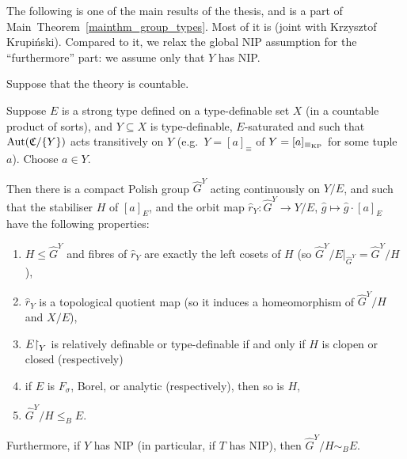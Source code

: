 	
	The following is one of the main results of the thesis, and is a part of Main~Theorem~\ref{mainthm_group_types}. Most of it is \cite[Theorem 8.1]{KR18} (joint with Krzysztof Krupiński). Compared to it, we relax the global NIP assumption for the ``furthermore'' part: we assume only that $Y$ has NIP.
	\begin{thm}
		\label{thm:main_aut}
		Suppose that the theory is countable.
		
		Suppose $E$ is a strong type defined on a type-definable set $X$ (in a countable product of sorts), and $Y\subseteq X$ is type-definable, $E$-saturated and such that $\operatorname{{Aut}}({\mathfrak C}/\{Y\})$ acts transitively on $Y$ (e.g.\ $Y=[a]_{\equiv}$ of $Y=[a]_{\equiv_{\mathrm{KP}}}$ for some tuple $a$). Choose $a\in Y$.
		
		Then there is a compact Polish group $\hat G^Y$ acting continuously on $Y/E$, and such that the stabiliser $H$ of $[a]_E$, and the orbit map $\hat r_Y\colon \hat G^Y\to Y/E$, $\hat g\mapsto \hat g\cdot [a]_E$ have the following properties:
		\begin{enumerate}
			\item
			$H\leq \hat G^Y$ and fibres of $\hat r_Y$ are exactly the left cosets of $H$ (so $\hat G^Y/E|_{\hat G^Y}=\hat G^Y/H$),
			\item
			$\hat r_Y$ is a topological quotient map (so it induces a homeomorphism of $\hat G^Y/H$ and $X/E$),
			\item
			$E\mathord{\upharpoonright}_Y$ is relatively definable or type-definable if and only if $H$ is clopen or closed (respectively)
			\item
			if $E$ is $F_\sigma$, Borel, or analytic (respectively), then so is $H$,
			\item
			$\hat G^Y/H\leq_B E$.
		\end{enumerate}
		Furthermore, if $Y$ has NIP (in particular, if $T$ has NIP), then $\hat G^Y/H\sim_B E$.
	\end{thm}
